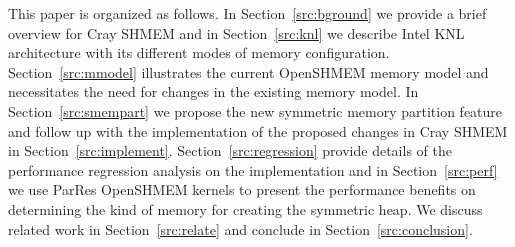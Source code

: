 This paper is organized as follows.
In Section~\ref{src:bground} we provide a brief overview for Cray SHMEM
and in Section~\ref{src:knl} we describe Intel KNL architecture with its
different modes of memory configuration. Section~\ref{src:mmodel}
illustrates the current OpenSHMEM memory model and necessitates the need
for changes in the existing memory model. In Section~\ref{src:smempart}
we propose the new symmetric memory partition feature and follow up with
the implementation of the proposed changes in Cray SHMEM in
Section~\ref{src:implement}.
Section~\ref{src:regression} provide details of the performance
regression analysis on the implementation and in Section~\ref{src:perf}
we use ParRes OpenSHMEM kernels to present the performance benefits on
determining the kind of memory for creating the symmetric heap. We
discuss related work in Section~\ref{src:relate} and conclude in
Section~\ref{src:conclusion}.